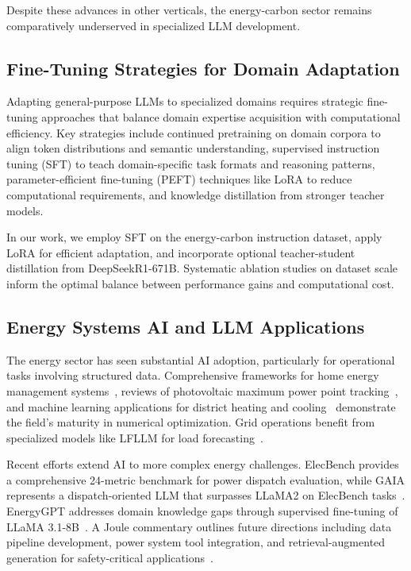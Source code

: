 \documentclass[]{interact}
\theoremstyle{plain}%
\theoremstyle{definition}
\theoremstyle{remark}
\begin{document}
Despite these advances in other verticals, the energy-carbon sector remains comparatively underserved in specialized LLM development.

\subsection{Fine-Tuning Strategies for Domain Adaptation}

Adapting general-purpose LLMs to specialized domains requires strategic fine-tuning approaches that balance domain expertise acquisition with computational efficiency. Key strategies include continued pretraining on domain corpora to align token distributions and semantic understanding, supervised instruction tuning (SFT) to teach domain-specific task formats and reasoning patterns, parameter-efficient fine-tuning (PEFT) techniques like LoRA to reduce computational requirements, and knowledge distillation from stronger teacher models.

In our work, we employ SFT on the energy-carbon instruction dataset, apply LoRA for efficient adaptation, and incorporate optional teacher-student distillation from DeepSeekR1-671B. Systematic ablation studies on dataset scale inform the optimal balance between performance gains and computational cost.

\subsection{Energy Systems AI and LLM Applications}

The energy sector has seen substantial AI adoption, particularly for operational tasks involving structured data. Comprehensive frameworks for home energy management systems~\cite{mahapatra2022hems}, reviews of photovoltaic maximum power point tracking~\cite{sarvi2022mppt_review}, and machine learning applications for district heating and cooling~\cite{ntakolia2022district_heating_ml_review} demonstrate the field's maturity in numerical optimization. Grid operations benefit from specialized models like LFLLM for load forecasting~\cite{liu2024lfllm}.

Recent efforts extend AI to more complex energy challenges. ElecBench provides a comprehensive 24-metric benchmark for power dispatch evaluation, while GAIA represents a dispatch-oriented LLM that surpasses LLaMA2 on ElecBench tasks~\cite{zhou2024elecbench,cheng2024gaia}. EnergyGPT addresses domain knowledge gaps through supervised fine-tuning of LLaMA 3.1-8B~\cite{chebbi2025energygptlargelanguagemodel}. A Joule commentary outlines future directions including data pipeline development, power system tool integration, and retrieval-augmented generation for safety-critical applications~\cite{majumder2024joule-llm-energy}.
\end{document}
